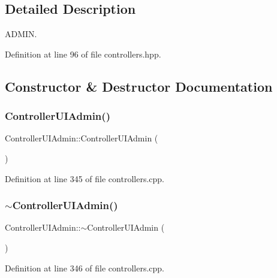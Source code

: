 \subsection{Detailed Description}
A\+D\+M\+IN. 

Definition at line 96 of file controllers.\+hpp.



\subsection{Constructor \& Destructor Documentation}
\mbox{\label{class_controller_u_i_admin_a53eae99487a6aadfb303aaacc3c975eb}} 
\subsubsection{\texorpdfstring{Controller\+U\+I\+Admin()}{ControllerUIAdmin()}}
{\footnotesize\ttfamily Controller\+U\+I\+Admin\+::\+Controller\+U\+I\+Admin (\begin{DoxyParamCaption}{ }\end{DoxyParamCaption})}



Definition at line 345 of file controllers.\+cpp.

\mbox{\label{class_controller_u_i_admin_aaaeea4ce8d4e357a4121b7c59a0e1288}} 
\subsubsection{\texorpdfstring{$\sim$\+Controller\+U\+I\+Admin()}{~ControllerUIAdmin()}}
{\footnotesize\ttfamily Controller\+U\+I\+Admin\+::$\sim$\+Controller\+U\+I\+Admin (\begin{DoxyParamCaption}{ }\end{DoxyParamCaption})}



Definition at line 346 of file controllers.\+cpp.



